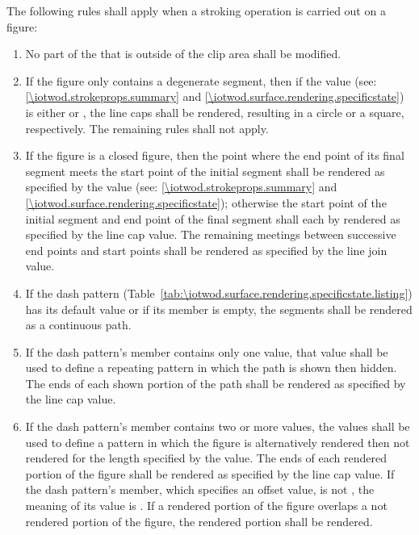 \pnum
The following rules shall apply when a stroking operation is carried out on a figure:
\begin{enumerate}
\item No part of the \underlyingsurface that is outside of the clip area shall be modified.

\item If the figure only contains a degenerate segment, then if the  value (see: \ref{\iotwod.strokeprops.summary} and \ref{\iotwod.surface.rendering.specificstate}) is either  or , the line caps shall be rendered, resulting in a circle or a square, respectively. The remaining rules shall not apply.

\item If the figure is a closed figure, then the point where the end point of its final segment meets the start point of the initial segment shall be rendered as specified by the  value (see: \ref{\iotwod.strokeprops.summary} and \ref{\iotwod.surface.rendering.specificstate}); otherwise the start point of the initial segment and end point of the final segment shall each by rendered as specified by the line cap value. The remaining meetings between successive end points and start points shall be rendered as specified by the line join value.

\item If the dash pattern (Table~\ref{tab:\iotwod.surface.rendering.specificstate.listing}) has its default value or if its  member is empty, the segments shall be rendered as a continuous path.

\item If the dash pattern's  member contains only one value, that value shall be used to define a repeating pattern in which the path is shown then hidden. The ends of each shown portion of the path shall be rendered as specified by the line cap value.

\item If the dash pattern's  member contains two or more values, the values shall be used to define a pattern in which the figure is alternatively rendered then not rendered for the length specified by the value. The ends of each rendered portion of the figure shall be rendered as specified by the line cap value. If the dash pattern's  member, which specifies an offset value, is not , the meaning of its value is . If a rendered portion of the figure overlaps a not rendered portion of the figure, the rendered portion shall be rendered.
\end{enumerate}

